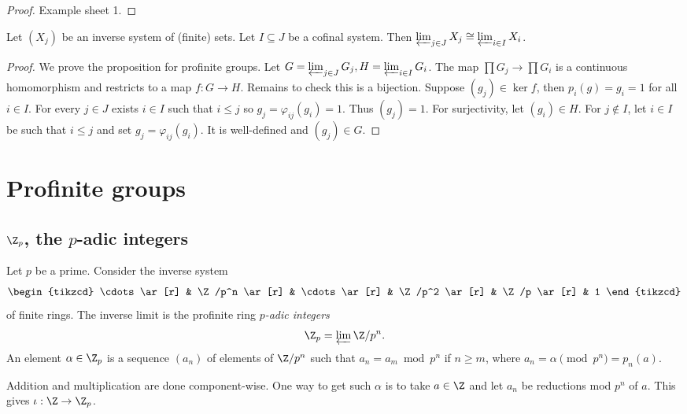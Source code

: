 \documentclass[a4paper]{article}
\begin{document}
\begin{proof}
  Example sheet 1.
\end{proof}

\begin{proposition}
  Let \((X_j)\) be an inverse system of (finite) sets. Let \(I \subseteq J\) be a cofinal system. Then \(\varprojlim_{j \in J} X_j \cong \varprojlim_{i \in I} X_i\).
\end{proposition}

\begin{proof}
  We prove the proposition for profinite groups. Let \(G = \varprojlim_{j \in J} G_j, H = \varprojlim_{i \in I} G_i\). The map \(\prod G_j \to \prod G_i\) is a continuous homomorphism and restricts to a map \(f: G \to H\). Remains to check this is a bijection. Suppose \((g_j) \in \ker f\), then \(p_i(g) = g_i = 1\) for all \(i \in I\). For every \(j \in J\) exists \(i \in I\) such that \(i \leq j\) so \(g_j = \varphi_{ij}(g_i) = 1\). Thus \((g_j) = 1\). For surjectivity, let \((g_i) \in H\). For \(j \notin I\), let \(i \in I\) be such that \(i \leq j\) and set \(g_j = \varphi_{ij}(g_i)\). It is well-defined and \((g_j) \in G\).
\end{proof}

\section{Profinite groups}

\subsection{\(\Z_p\), the \(p\)-adic integers}

Let \(p\) be a prime. Consider the inverse system
\[
  \begin{tikzcd}
    \cdots \ar[r] & \Z/p^n \ar[r] & \cdots \ar[r] & \Z/p^2 \ar[r] & \Z/p \ar[r] & 1
  \end{tikzcd}
\]
of finite rings. The inverse limit is the profinite ring \emph{\(p\)-adic integers}
\[
  \Z_p = \varprojlim \Z/p^n.
\]
An element \(\alpha \in \Z_p\) is a sequence \((a_n)\) of elements of \(\Z/p^n\) such that \(a_n = a_m \bmod{p^n}\) if \(n \geq m\), where \(a_n = \alpha \pmod{p^n} = p_n(a)\).

Addition and multiplication are done component-wise. One way to get such \(\alpha\) is to take \(a \in \Z\) and let \(a_n\) be reductions mod \(p^n\) of \(a\). This gives \(\iota: \Z \to \Z_p\).
\end{document}
